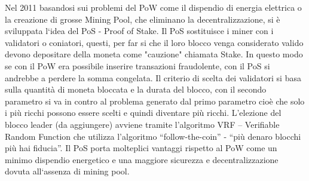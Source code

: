 \documentclass[11pt,a4paper,titlepage,twoside,openright]{report}
\begin{document}
Nel 2011 basandosi sui problemi del PoW come il dispendio di energia elettrica o la creazione di grosse Mining Pool, che eliminano la decentralizzazione, si è sviluppata l`idea del PoS - Proof of Stake. Il PoS sostituisce i miner con i validatori o coniatori, questi, per far si che il loro blocco venga considerato valido devono depositare della moneta come "cauzione" chiamata Stake.
In questo modo se con il PoW era possibile inserire transazioni fraudolente, con il PoS si andrebbe a perdere la somma congelata. Il criterio di scelta dei validatori si basa sulla quantità di moneta bloccata e la durata del blocco, con il secondo parametro si va in contro al problema generato dal primo parametro cioè che solo i più ricchi possono essere scelti e quindi diventare più ricchi.
L’elezione del blocco leader (da aggiungere) avviene tramite l’algoritmo VRF – Verifiable Random Function che utilizza l’algoritmo “follow-the-coin” - “più denaro blocchi più hai fiducia”. Il PoS porta molteplici vantaggi rispetto al PoW come un minimo dispendio energetico e una maggiore sicurezza e decentralizzazione dovuta all`assenza di mining pool.
\end{document}
